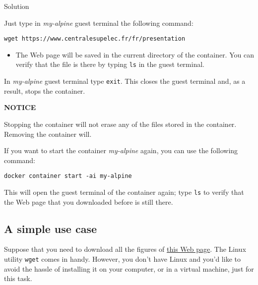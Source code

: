 \documentclass[
]{article}
\providecommand{\tightlist}{%
  \setlength{\itemsep}{0pt}\setlength{\parskip}{0pt}}
\newenvironment{infobox}[1]
  {
  \begin{itemize}
  \renewcommand{\labelitemi}{
    \raisebox{-.7\height}[0pt][0pt]{
      
    }
  }
  \setlength{\fboxsep}{1em}
  \begin{whitebox}
  \item
  }
  {
  \end{whitebox}
  \end{itemize}
  }
\theoremstyle{definition}
\theoremstyle{definition}
\theoremstyle{definition}
\theoremstyle{remark}
\begin{document}
Solution

\begin{infobox}{exercisebox}

Just type in \emph{my-alpine} guest terminal the following command:

\begin{verbatim}
wget https://www.centralesupelec.fr/fr/presentation
\end{verbatim}

\begin{itemize}
\tightlist
\item
  The Web page will be saved in the current directory
  of the container. You can verify that the file is there
  by typing \texttt{ls} in the guest terminal.
\end{itemize}

\end{infobox}

In \emph{my-alpine} guest terminal type \texttt{exit}.
This closes the guest terminal and, as a result, stops the
container.

\begin{infobox}{warning}

\textbf{NOTICE}

Stopping the container will not erase any of the files
stored in the container. Removing the container will.

\end{infobox}

If you want to start the container \emph{my-alpine} again, you can
use the following command:

\begin{verbatim}
docker container start -ai my-alpine
\end{verbatim}

This will open the guest terminal of the container again;
type \texttt{ls} to verify that
the Web page that you downloaded before is still there.

\hypertarget{simple-use-case}{%
\subsection{A simple use case}\label{simple-use-case}}

Suppose that you need to download all the figures of
\href{https://www.centralesupelec.fr/fr/presentation}{this Web page}.
The Linux utility \texttt{wget} comes in handy.
However, you don't have Linux and you'd like to
avoid the hassle of installing it on your computer, or in a virtual machine,
just for this task.
\end{document}
